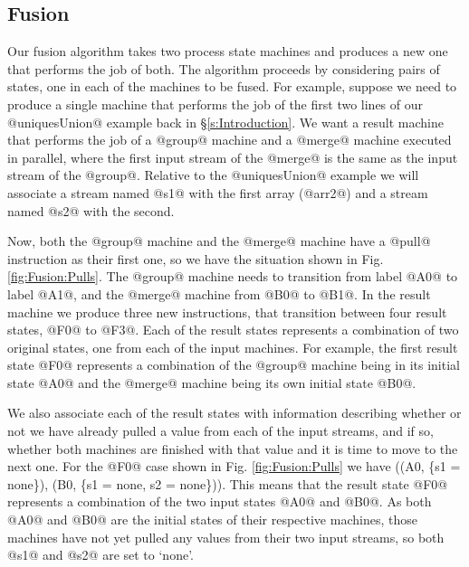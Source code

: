 

\clearpage{}
\subsection{Fusion}
Our fusion algorithm takes two process state machines and produces a new one that performs the job of both. The algorithm proceeds by considering pairs of states, one in each of the machines to be fused. For example, suppose we need to produce a single machine that performs the job of the first two lines of our @uniquesUnion@ example back in \S\ref{s:Introduction}. We want a result machine that performs the job of a @group@ machine and a @merge@ machine executed in parallel, where the first input stream of the @merge@ is the same as the input stream of the @group@. Relative to the @uniquesUnion@ example we will associate a stream named @s1@ with the first array (@arr2@) and a stream named @s2@ with the second. 

Now, both the @group@ machine and the @merge@ machine have a @pull@ instruction as their first one, so we have the situation shown in Fig.\ref{fig:Fusion:Pulls}. The @group@ machine needs to transition from label @A0@ to label @A1@, and the @merge@ machine from @B0@ to @B1@. In the result machine we produce three new instructions, that transition between four result states, @F0@ to @F3@. Each of the result states represents a combination of two original states, one from each of the input machines. For example, the first result state @F0@ represents a combination of the @group@ machine being in its initial state @A0@ and the @merge@ machine being its own initial state @B0@. 

We also associate each of the result states with information describing whether or not we have already pulled a value from each of the input streams, and if so, whether both machines are finished with that value and it is time to move to the next one. For the @F0@ case shown in Fig. \ref{fig:Fusion:Pulls} we have ((A0, \{s1 = none\}), (B0, \{s1 = none, s2 = none\})). This means that the result state @F0@ represents a combination of the two input states @A0@ and @B0@. As both @A0@ and @B0@ are the initial states of their respective machines, those machines have not yet pulled any values from their two input streams, so both @s1@ and @s2@ are set to `none'.








